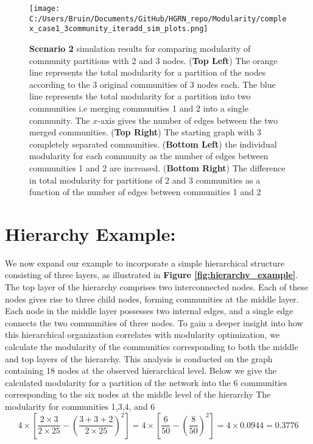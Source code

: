 \documentclass[a4paper,12pt]{article}
\begin{document}
	\begin{figure}[H]
		\caption{\textbf{Scenario 2} simulation results for comparing modularity of community partitions with 2 and 3 nodes. (\textbf{Top Left}) The orange line represents the total modularity for a partition of the nodes according to the 3 original communities of 3 nodes each. The blue line represents the total modularity for a partition into two communities i.e merging communities 1 and 2 into a single community. The $x$-axis gives the number of edges between the two merged communities. (\textbf{Top Right}) The starting graph with 3 completely separated communities. (\textbf{Bottom Left}) the individual modularity for each community as the number of edges between communities 1 and 2 are increased. (\textbf{Bottom Right}) The difference in total modularity for partitions of 2 and 3 communities as a function of the number of edges between communities 1 and 2}
		\texttt{[image: C:/Users/Bruin/Documents/GitHub/HGRN\_repo/Modularity/complex\_case1\_3community\_iteradd\_sim\_plots.png]}
		\label{fig:add_sim2_simplots}
	\end{figure}
	
	
	
	\section{Hierarchy Example:}
	
	We now expand our example to incorporate a simple hierarchical structure consisting of three layers, as illustrated in \textbf{Figure \ref{fig:hierarchy_example}}. The top layer of the hierarchy comprises two interconnected nodes. Each of these nodes gives rise to three child nodes, forming communities at the middle layer. Each node in the middle layer possesses two internal edges, and a single edge connects the two communities of three nodes. To gain a deeper insight into how this hierarchical organization correlates with modularity optimization, we calculate the modularity of the communities corresponding to both the middle and top layers of the hierarchy. This analysis is conducted on the graph containing 18 nodes at the observed hierarchical level. Below we give the calculated modularity for a partition of the network into the 6 communities corresponding to the six nodes at the middle level of the hierarchy
	The modularity for communities 1,3,4, and 6
	\[ 4\times \left[\frac{2\times 3}{2\times 25}-\left(\frac{3+3+2}{2\times 25}\right)^2\right] =  4\times \left[\frac{6}{50}-\left(\frac{8}{50}\right)^2\right] = 4\times 0.0944 = 0.3776\]
	
\end{document}

